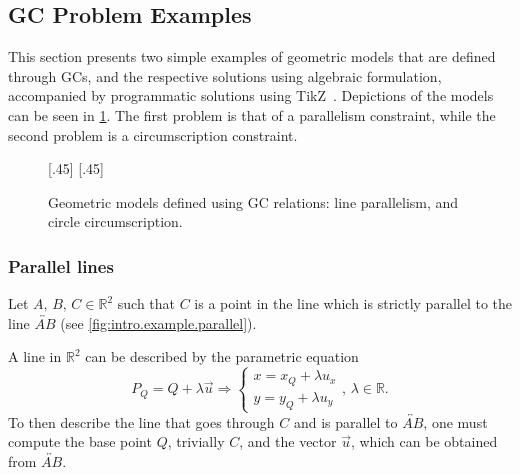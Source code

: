 \subsection{\acl{GC} Problem Examples}%
\label{sec:intro.examples}

This section presents two simple examples of geometric models that are defined
through \acp{GC}, and the respective solutions using algebraic formulation,
accompanied by programmatic solutions using \acs{TikZ}~\cite{Tantau:2021:TikZ}.
Depictions of the models can be seen in \cref{fig:intro.example}.  The first
problem is that of a parallelism constraint, while the second problem is a
circumscription constraint.

\begin{figure}[htpb]
    [.45\linewidth]{\resizebox{\linewidth}{!}{%
      }}
  \hspace{\fill}
    [.45\linewidth]{\resizebox{\linewidth}{!}{%
      }}
  \caption[Geometric models defined using GCs]{
    Geometric models defined using \ac{GC} relations:
     line parallelism, and
     circle circumscription.}%
  \label{fig:intro.example}
\end{figure}

\subsubsection{Parallel lines}%
\label{sec:intro.examples.parallel}

Let $A,\, B,\, C \in \mathbb{R}^2$ such that $C$ is a point in the line which is
strictly parallel to the line $\overleftrightarrow{AB}$ (see
\cref{fig:intro.example.parallel}).

A line in $\mathbb{R}^2$ can be described by the parametric equation
\begin{equation}\label{eq:line.parametric.2}
  P_Q = Q + \lambda\vec{u} \Rightarrow
  \begin{cases}
    x = x_Q + \lambda u_x \\
    y = y_Q + \lambda u_y
  \end{cases},\,\lambda \in \mathbb{R}.
\end{equation}
To then describe the line that goes through $C$ and is parallel to
$\overleftrightarrow{AB}$, one must compute the base point $Q$, trivially $C$,
and the vector $\vec{u}$, which can be obtained from $\overleftrightarrow{AB}$.

